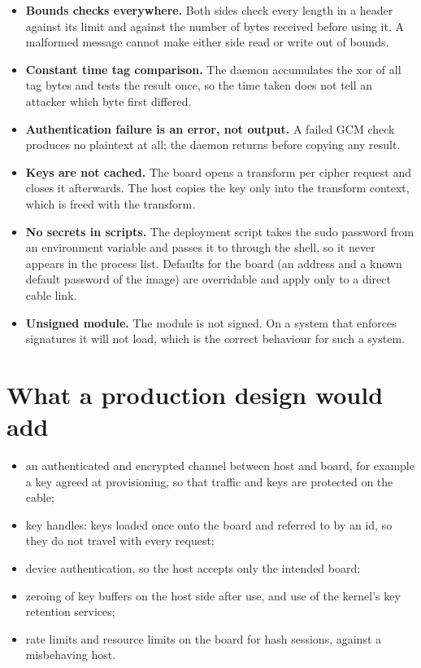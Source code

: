 \begin{itemize}
  \item \textbf{Bounds checks everywhere.} Both sides check every length in a header against its limit and against the number of bytes received before using it. A malformed message cannot make either side read or write out of bounds.
  \item \textbf{Constant time tag comparison.} The daemon accumulates the xor of all tag bytes and tests the result once, so the time taken does not tell an attacker which byte first differed.
  \item \textbf{Authentication failure is an error, not output.} A failed GCM check produces no plaintext at all; the daemon returns  before copying any result.
  \item \textbf{Keys are not cached.} The board opens a transform per cipher request and closes it afterwards. The host copies the key only into the transform context, which is freed with the transform.
  \item \textbf{No secrets in scripts.} The deployment script takes the sudo password from an environment variable and passes it to  through the shell, so it never appears in the process list. Defaults for the board (an address and a known default password of the image) are overridable and apply only to a direct cable link.
  \item \textbf{Unsigned module.} The module is not signed. On a system that enforces signatures it will not load, which is the correct behaviour for such a system.
\end{itemize}

\section{What a production design would add}

\begin{itemize}
  \item an authenticated and encrypted channel between host and board, for example a key agreed at provisioning, so that traffic and keys are protected on the cable;
  \item key handles: keys loaded once onto the board and referred to by an id, so they do not travel with every request;
  \item device authentication, so the host accepts only the intended board;
  \item zeroing of key buffers on the host side after use, and use of the kernel's key retention services;
  \item rate limits and resource limits on the board for hash sessions, against a misbehaving host.
\end{itemize}
